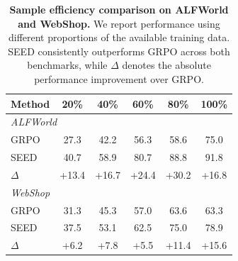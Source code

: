 
\begin{table}[htbp]
\centering
\caption{\textbf{Sample efficiency comparison on ALFWorld and WebShop.}
We report performance using different proportions of the available training data. SEED consistently outperforms GRPO across both benchmarks, while $\Delta$ denotes the absolute performance improvement over GRPO.}
\vspace{0.05in}
\label{tab:sample_efficiency}
\setlength{\tabcolsep}{8pt}
\renewcommand{\arraystretch}{1.08}

\begin{tabular}{lccccc}
\toprule
\textbf{Method}
& \textbf{20\%}
& \textbf{40\%}
& \textbf{60\%}
& \textbf{80\%}
& \textbf{100\%} \\
\midrule

\multicolumn{6}{l}{\textit{ALFWorld}} \\
GRPO
& 27.3 & 42.2 & 56.3 & 58.6 & 75.0 \\
\rowcolor{gray!10}
SEED
& 40.7 & 58.9 & 80.7 & 88.8 & 91.8 \\
\rowcolor{blue!6}
$\Delta$
& +13.4 & +16.7 & +24.4 & +30.2 & +16.8 \\

\midrule

\multicolumn{6}{l}{\textit{WebShop}} \\
GRPO
& 31.3 & 45.3 & 57.0 & 63.6 & 63.3 \\
\rowcolor{gray!10}
SEED
& 37.5 & 53.1 & 62.5 & 75.0 & 78.9 \\
\rowcolor{blue!6}
$\Delta$
& +6.2 & +7.8 & +5.5 & +11.4 & +15.6 \\

\bottomrule
\end{tabular}
\end{table}


